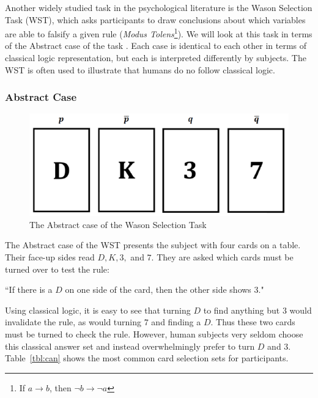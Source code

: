 \documentclass[
11pt, %
english, %
singlespacing, %
headsepline, %
]{MastersDoctoralThesis} %
\begin{document}
Another widely studied task in the psychological literature is the Wason Selection Task (WST), which asks participants to draw conclusions about which variables are able to falsify a given rule (\textit{Modus Tolens}\footnote{If $a\rightarrow b$, then $\lnot b \rightarrow \lnot a$}). We will look at this task in terms of the Abstract case of the task \citep{wason1968reasoning}. Each case is identical to each other in terms of classical logic representation, but each is interpreted differently by subjects. The WST is often used to illustrate that humans do no follow classical logic.

\subsubsection*{Abstract Case}

\begin{figure}
\begin{center}
\includegraphics[scale=0.5]{wasonAbstract}
\caption{The Abstract case of the Wason Selection Task}
\end{center}
\end{figure}

The Abstract case of the WST presents the subject with four cards on a table. Their face-up sides read $D, K, 3,$ and $7$. They are asked which cards must be turned over to test the rule:

\begin{center}
``If there is a $D$ on one side of the card, then the other side shows $3$."
\end{center} 
Using classical logic, it is easy to see that turning $D$ to find anything but $3$ would invalidate the rule, as would turning $7$ and finding a $D$. Thus these two cards must be turned to check the rule. However, human subjects very seldom choose this classical answer set and instead overwhelmingly prefer to turn $D$ and $3$. Table~\ref{tbl:can} shows the most common card selection sets for participants.
\end{document}
